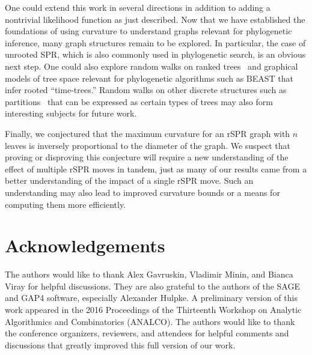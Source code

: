 \documentclass[]{elsarticle}
\begin{document}
One could extend this work in several directions in addition to adding a nontrivial likelihood function as just described.
Now that we have established the foundations of using curvature to understand graphs relevant for phylogenetic inference, many graph structures remain to be explored.
In particular, the case of unrooted SPR, which is also commonly used in phylogenetic search, is an obvious next step.
One could also explore random walks on ranked trees~\citep{Song2006-xe} and graphical models of tree space relevant for phylogenetic algorithms such as BEAST \citep{Drummond2012-ek} that infer rooted ``time-trees.''
Random walks on other discrete structures such as partitions~\citep{Gusfield2002-il} that can be expressed as certain types of trees may also form interesting subjects for future work.

Finally, we conjectured that the maximum curvature for an rSPR graph with $n$ leaves is inversely proportional to the diameter of the graph.
We suspect that proving or disproving this conjecture will require a new understanding of the effect of multiple rSPR moves in tandem, just as many of our results came from a better understanding of the impact of a single rSPR move.
Such an understanding may also lead to improved curvature bounds or a means for computing them more efficiently.


\section{Acknowledgements}
The authors would like to thank Alex Gavruskin, Vladimir Minin, and Bianca Viray for helpful discussions.
They are also grateful to the authors of the SAGE and GAP4 software, especially Alexander Hulpke.
A preliminary version of this work appeared in the 2016 Proceedings of the Thirteenth Workshop on Analytic Algorithmics and Combinatorics (ANALCO).
The authors would like to thank the conference organizers, reviewers, and attendees for helpful comments and discussions that greatly improved this full version of our work.



\end{document}
